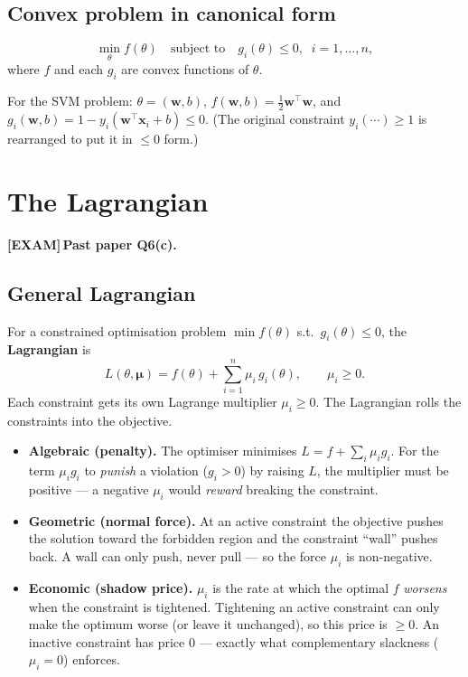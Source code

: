 \documentclass[11pt, a4paper]{article}
\newcommand{\examflag}{\textcolor{tipBd}{\textbf{[EXAM]}}\,}
\begin{document}
\subsection{Convex problem in canonical form}

\begin{defbox}
\[
\min_{\theta} f(\theta) \quad \text{subject to} \quad g_i(\theta) \le 0, \;\; i = 1, \ldots, n,
\]
where $f$ and each $g_i$ are convex functions of $\theta$.
\end{defbox}

For the SVM problem: $\theta = (\mathbf{w}, b)$, $f(\mathbf{w}, b) = \tfrac{1}{2}\mathbf{w}^\top\mathbf{w}$, and $g_i(\mathbf{w}, b) = 1 - y_i(\mathbf{w}^\top\mathbf{x}_i + b) \le 0$. (The original constraint $y_i(\cdots) \ge 1$ is rearranged to put it in $\le 0$ form.)

\section{The Lagrangian}

\examflag{}\textbf{Past paper Q6(c).}

\subsection{General Lagrangian}

\begin{defbox}[Lagrangian]
For a constrained optimisation problem $\min f(\theta)$ s.t.\ $g_i(\theta) \le 0$, the \textbf{Lagrangian} is
\[
L(\theta, \boldsymbol\mu) = f(\theta) + \sum_{i=1}^n \mu_i\,g_i(\theta), \qquad \mu_i \ge 0.
\]
Each constraint gets its own Lagrange multiplier $\mu_i \ge 0$. The Lagrangian rolls the constraints into the objective.
\end{defbox}

\begin{notebox}
\begin{itemize}
  \item \textbf{Algebraic (penalty).} The optimiser minimises $L = f + \sum_i\mu_i g_i$. For the term
  $\mu_i g_i$ to \emph{punish} a violation ($g_i > 0$) by raising $L$, the multiplier must be
  positive — a negative $\mu_i$ would \emph{reward} breaking the constraint.
  \item \textbf{Geometric (normal force).} At an active constraint the objective pushes the solution
  toward the forbidden region and the constraint ``wall'' pushes back. A wall can only push, never
  pull — so the force $\mu_i$ is non-negative.
  \item \textbf{Economic (shadow price).} $\mu_i$ is the rate at which the optimal $f$ \emph{worsens}
  when the constraint is tightened. Tightening an active constraint can only make the optimum worse
  (or leave it unchanged), so this price is $\ge 0$. An inactive constraint has price $0$ — exactly
  what complementary slackness ($\mu_i = 0$) enforces.
\end{itemize}
\end{notebox}
\end{document}
